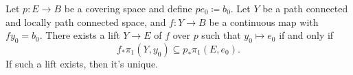 \begin{lemma}
    \label{lem:general-lifting-lemma}
    Let \(p: E \to B\) be a covering space and define \(p e_0 \coloneq b_0\). Let
    \(Y\) be a path connected and locally path connected space, and \(f: Y \to B\)
    be a continuous map with \(f y_0 = b_0\). There exists a lift \(Y \to E\) of
    \(f\) over \(p\) such that \(y_0 \mapsto e_0\) if and only if
    \[
        f_{*} \pi_1(Y, y_0) \subseteq p_{*} \pi_1(E, e_0).
    \]
    If such a lift exists, then it's unique.
\end{lemma}

